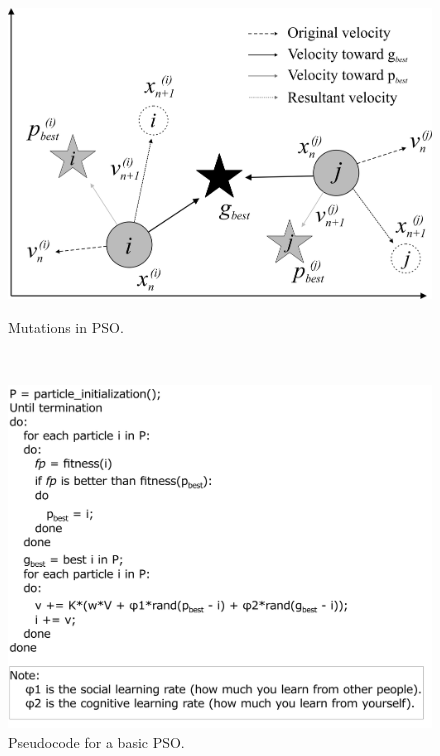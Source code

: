 
\begin{figure}[!b]
\begin{minipage}{0.5\linewidth}
\includegraphics[width=\linewidth]{figs/pso_demo.png}
\caption{Mutations in PSO.}
\label{fig:pso}
\end{minipage}~~~~\begin{minipage}{0.5\linewidth}
\includegraphics[width=\linewidth]{figs/pso_pseudo.png}
\caption{Pseudocode for a basic PSO.}
\label{fig:pso_pseudo}
\end{minipage}
\end{figure}


